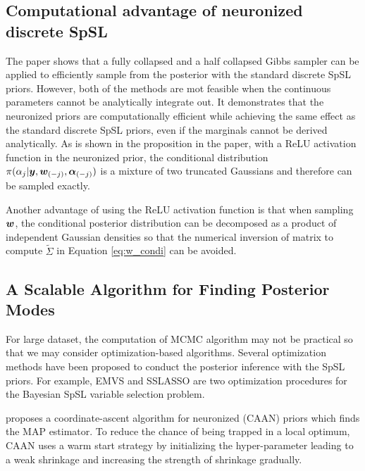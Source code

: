 \subsection{Computational advantage of neuronized discrete SpSL} \label{sec:neu_dis_spsl_com}

The paper \citep{shin2021neuronized} shows that a fully collapsed and a half collapsed Gibbs sampler can be applied to efficiently sample from the posterior with the standard discrete SpSL priors. However, both of the methods are mot feasible when the continuous parameters cannot be analytically integrate out. It demonstrates that the neuronized priors are computationally efficient while achieving the same effect as the standard discrete SpSL priors, even if the marginals cannot be derived analytically. As is shown in the proposition in the paper, with a ReLU activation function in the neuronized prior, the conditional distribution $\pi(\alpha_j|\bm{y}, \bm{w}_{(-j)}, \bm{\alpha}_{(-j)})$ is a mixture of two truncated Gaussians and therefore can be sampled exactly.

Another advantage of using the ReLU activation function is that when sampling $\bm{w}$, the conditional posterior distribution can be decomposed as a product of independent Gaussian densities so that the numerical inversion of matrix to compute $\tilde{\Sigma}$ in Equation \eqref{eq:w_condi} can be avoided.

\subsection{A Scalable Algorithm for Finding Posterior Modes}

For large dataset, the computation of MCMC algorithm may not be practical so that we may consider optimization-based algorithms. Several optimization methods have been proposed to conduct the posterior inference with the SpSL priors. For example, EMVS \citep{rovckova2014emvs} and SSLASSO \citep{rovckova2018spike} are two optimization procedures for the Bayesian SpSL variable selection problem.

\citet{shin2021neuronized} proposes a coordinate-ascent algorithm for neuronized (CAAN) priors which finds the MAP estimator. To reduce the chance of being trapped in a local optimum, CAAN uses a warm start strategy by initializing the hyper-parameter leading to a weak shrinkage and increasing the strength of shrinkage gradually. 

